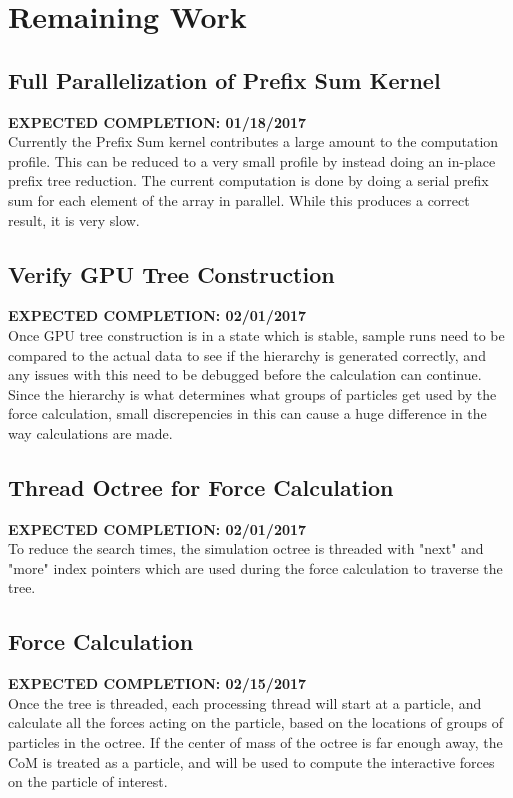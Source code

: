 \documentclass[fleqn,10pt]{SelfArx} %
\begin{document}

\section{Remaining Work}

\subsection{Full Parallelization of Prefix Sum Kernel}
\textbf{EXPECTED COMPLETION: 01/18/2017}\\
Currently the Prefix Sum kernel contributes a large amount to the computation profile. This can be reduced to a very small profile by instead doing an in-place prefix tree reduction. The current computation is done by doing a serial prefix sum for each element of the array in parallel. While this produces a correct result, it is very slow.

\subsection{Verify GPU Tree Construction}
\textbf{EXPECTED COMPLETION: 02/01/2017}\\
Once GPU tree construction is in a state which is stable, sample runs need to be compared to the actual data to see if the hierarchy is generated correctly, and any issues with this need to be debugged before the calculation can continue. Since the hierarchy is what determines what groups of particles get used by the force calculation, small discrepencies in this can cause a huge difference in the way calculations are made.

\subsection{Thread Octree for Force Calculation}
\textbf{EXPECTED COMPLETION: 02/01/2017}\\
To reduce the search times, the simulation octree is threaded with "next" and "more" index pointers which are used during the force calculation to traverse the tree. 


\subsection{Force Calculation}
\textbf{EXPECTED COMPLETION: 02/15/2017}\\
Once the tree is threaded, each processing thread will start at a particle, and calculate all the forces acting on the particle, based on the locations of groups of particles in the octree. If the center of mass of the octree is far enough away, the CoM is treated as a particle, and will be used to compute the interactive forces on the particle of interest.
\end{document}
